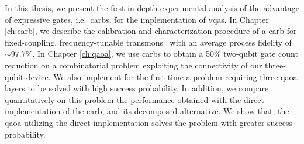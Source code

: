 In this thesis, we present the first in-depth experimental analysis of the advantage of expressive gates, i.e.\  \glspl{carb}, for the implementation of \glspl{vqa}. In Chapter \ref{ch:carb}, we describe the calibration and characterization procedure of a \gls{carb} for fixed-coupling, frequency-tunable transmons~\cite{DiCarlo2009DemonstrationProcessor} with an average process fidelity of $\sim 97.7\%$. In Chapter \ref{ch:qaoa}, we use \glspl{carb} to obtain a 50\% two-qubit gate count reduction on  a combinatorial problem exploiting the connectivity of our three-qubit device. We also implement for the first time a problem requiring three \gls{qaoa} layers to be solved with high success probability. In addition, we compare quantitatively on this problem the performance obtained with the direct implementation of the \gls{carb}, and its decomposed alternative. We show that, the \gls{qaoa} utilizing the direct implementation solves the problem with greater success probability. 
 